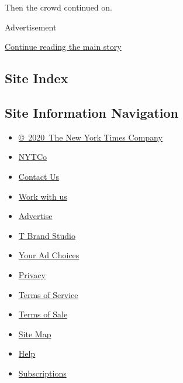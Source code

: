 Then the crowd continued on.

Advertisement

\protect\hyperlink{after-bottom}{Continue reading the main story}

\hypertarget{site-index}{%
\subsection{Site Index}\label{site-index}}

\hypertarget{site-information-navigation}{%
\subsection{Site Information
Navigation}\label{site-information-navigation}}

\begin{itemize}
\tightlist
\item
  \href{https://help.nytimes3xbfgragh.onion/hc/en-us/articles/115014792127-Copyright-notice}{©~2020~The
  New York Times Company}
\end{itemize}

\begin{itemize}
\tightlist
\item
  \href{https://www.nytco.com/}{NYTCo}
\item
  \href{https://help.nytimes3xbfgragh.onion/hc/en-us/articles/115015385887-Contact-Us}{Contact
  Us}
\item
  \href{https://www.nytco.com/careers/}{Work with us}
\item
  \href{https://nytmediakit.com/}{Advertise}
\item
  \href{http://www.tbrandstudio.com/}{T Brand Studio}
\item
  \href{https://www.nytimes3xbfgragh.onion/privacy/cookie-policy\#how-do-i-manage-trackers}{Your
  Ad Choices}
\item
  \href{https://www.nytimes3xbfgragh.onion/privacy}{Privacy}
\item
  \href{https://help.nytimes3xbfgragh.onion/hc/en-us/articles/115014893428-Terms-of-service}{Terms
  of Service}
\item
  \href{https://help.nytimes3xbfgragh.onion/hc/en-us/articles/115014893968-Terms-of-sale}{Terms
  of Sale}
\item
  \href{https://spiderbites.nytimes3xbfgragh.onion}{Site Map}
\item
  \href{https://help.nytimes3xbfgragh.onion/hc/en-us}{Help}
\item
  \href{https://www.nytimes3xbfgragh.onion/subscription?campaignId=37WXW}{Subscriptions}
\end{itemize}
